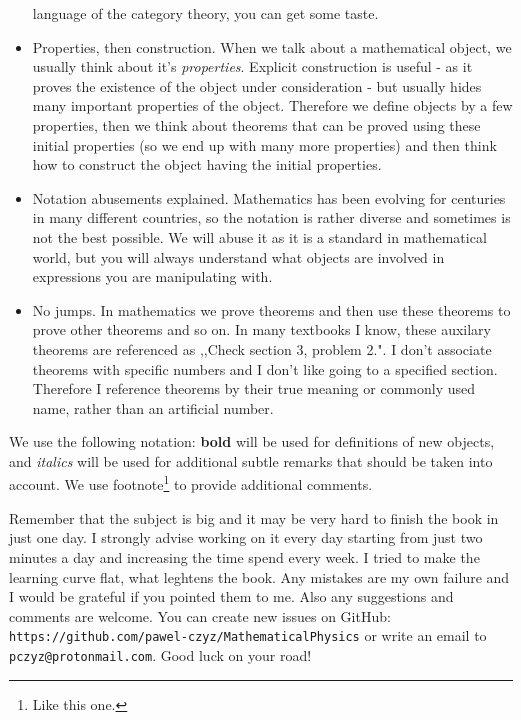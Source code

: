 \begin{itemize}
    language of the category theory, you can get some taste.
  \item Properties, then construction. When we talk about a mathematical object, we usually think about it's \textit{properties}. Explicit construction is useful - as it proves
    the existence of the object under consideration - but usually hides many important properties of the object. Therefore we define objects by a few properties, then we think about
    theorems that can be proved using these initial properties (so we end up with many more properties) and then think how to construct the object having the initial properties.
  \item Notation abusements explained. Mathematics has been evolving for centuries in many different countries, so the notation
    is rather diverse and sometimes is not the best possible. We will abuse it as it is a standard in mathematical world, but you will always understand
    what objects are involved in expressions you are manipulating with.
  \item No jumps. In mathematics we prove theorems and then use these theorems to prove other theorems and so on. In many textbooks I know, these auxilary theorems are referenced
    as ,,Check section 3, problem 2.". I don't associate theorems with specific numbers and I don't like going to a specified section. Therefore I reference theorems by their
    true meaning or commonly used name, rather than an artificial number.
\end{itemize}

We use the following notation: \textbf{bold} will be used for definitions of new objects, and \textit{italics} will be used for additional subtle remarks that should be taken into
account. We use footnote\footnote{Like this one.} to provide additional comments.


Remember that the subject is big and it may be very hard to finish the book in just one day. I strongly advise working on it every day starting from just two minutes a day
and increasing the time spend every week. I tried to make the learning curve flat, what leghtens the book.
Any mistakes are my own failure and I would be grateful if you pointed them to me. Also any suggestions and comments are welcome. You can
create new issues on GitHub: \texttt{https://github.com/pawel-czyz/MathematicalPhysics} or write an email to \texttt{pczyz@protonmail.com}.
Good luck on your road!
%
